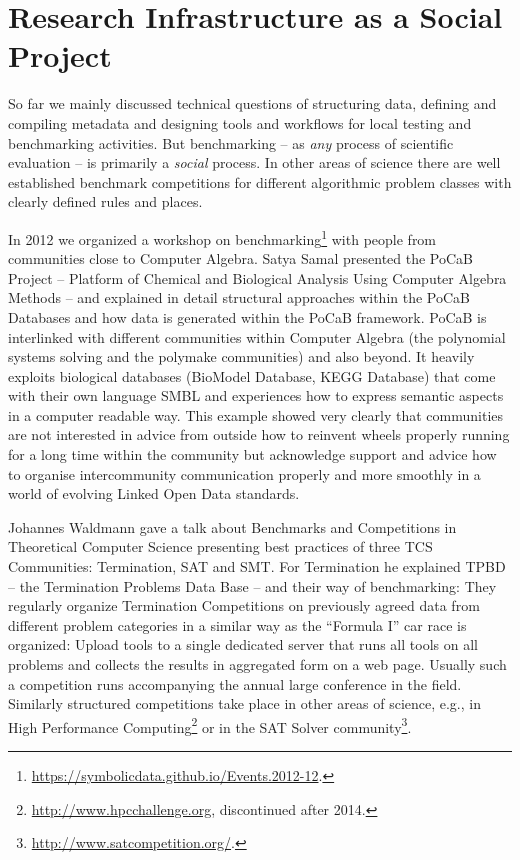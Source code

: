 \documentclass[a4paper,11pt]{article}
\begin{document}
\section{Research Infrastructure as a Social Project}

So far we mainly discussed technical questions of structuring data, defining
and compiling metadata and designing tools and workflows for local testing and
benchmarking activities.  But benchmarking -- as \emph{any} process of
scientific evaluation -- is primarily a \emph{social} process.  In other areas
of science there are well established benchmark competitions for different
algorithmic problem classes with clearly defined rules and places.

In 2012 we organized a workshop on
benchmarking\footnote{\url{https://symbolicdata.github.io/Events.2012-12}.}
with people from communities close to Computer Algebra.  Satya Samal presented
the PoCaB Project -- Platform of Chemical and Biological Analysis Using
Computer Algebra Methods -- and explained in detail structural approaches
within the PoCaB Databases and how data is generated within the PoCaB
framework.  PoCaB is interlinked with different communities within Computer
Algebra (the polynomial systems solving and the polymake communities) and also
beyond. It heavily exploits biological databases (BioModel Database, KEGG
Database) that come with their own language SMBL and experiences how to express
semantic aspects in a computer readable way. This example showed very clearly
that communities are not interested in advice from outside how to reinvent
wheels properly running for a long time within the community but acknowledge
support and advice how to organise intercommunity communication properly and
more smoothly in a world of evolving Linked Open Data standards.

Johannes Waldmann gave a talk about Benchmarks and Competitions in Theoretical
Computer Science presenting best practices of three TCS Communities:
Termination, SAT and SMT. For Termination he explained TPBD -- the Termination
Problems Data Base -- and their way of benchmarking: They regularly organize
Termination Competitions on previously agreed data from different problem
categories in a similar way as the “Formula I” car race is organized: Upload
tools to a single dedicated server that runs all tools on all problems and
collects the results in aggregated form on a web page. Usually such a
competition runs accompanying the annual large conference in the field.
Similarly structured competitions take place in other areas of science, e.g.,
in High Performance Computing\footnote{\url{http://www.hpcchallenge.org},
  discontinued after 2014.} or in the SAT Solver
community\footnote{\url{http://www.satcompetition.org/}.}.
\end{document}
